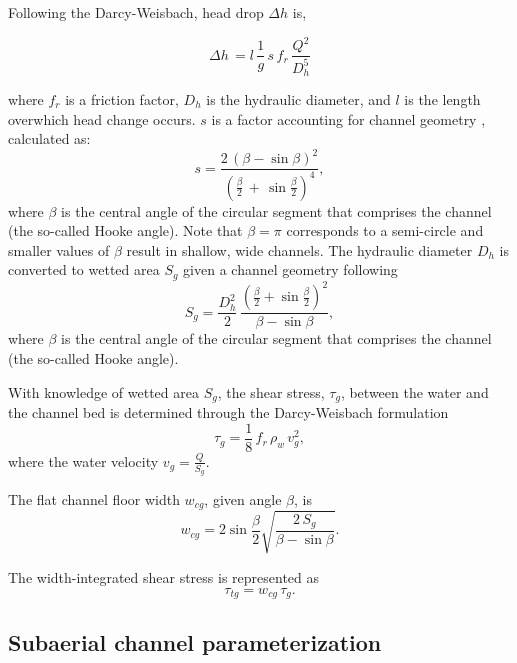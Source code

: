 \documentclass[11pt]{article}
\begin{document}
Following the Darcy-Weisbach, head drop $\Delta h$ is,
\begin{linenomath*}
  \begin{equation}
    \label{eq:dh}
    \Delta h \,  = l \,\frac{1}{g}\,s\,f_r\,\frac{Q^2}{D_h^5}
  \end{equation}
\end{linenomath*}
\noindent where $f_r$ is a friction factor, $D_h$ is the hydraulic diameter, and $l$ is the length overwhich head change occurs. $s$ is a factor accounting for channel geometry \citep{hooke1990}, calculated as:
\begin{equation}
  \label{eq:Hf}
  s = \frac{2\,(\beta -\sin \beta)^2}{(\frac{\beta}{2}\,+\,\sin \frac{\beta}{2})^4},
\end{equation}
where $\beta$ is the central angle of the circular segment that comprises the channel (the so-called Hooke angle). Note that $\beta =\pi$ corresponds to a semi-circle and
smaller values of $\beta$ result in shallow, wide channels.
The hydraulic diameter $D_h$ is converted to wetted area $S_g$ given a channel geometry following \citep{hooke1990}
\begin{equation}
  \label{eq:Dh2S}
  S_g= \frac{D_h^2}{2}\,\frac{(\frac{\beta}{2}+\sin \frac{\beta}{2})^2}{\beta - \sin \beta},
\end{equation}
where $\beta$ is the central angle of the circular segment that comprises the channel (the so-called Hooke angle). 


With knowledge of wetted area $S_g$, the shear stress, $\tau_g$, between the water and the channel bed is determined through the Darcy-Weisbach formulation
\begin{equation}
  \label{eq:tau}
  \tau_g=\frac{1}{8}\,f_r\,\rho_w\,v_g^2,
\end{equation}
%
where  the water velocity $v_g = \frac{Q}{S_g}$.

The flat channel floor width $w_{cg}$, given angle $\beta$, is
\begin{equation}
  \label{eq:dh2wc}
  w_{cg} = 2  \sin \frac{\beta}{2} \sqrt{\frac{2\, S_g}{\beta -\sin \beta}}.
\end{equation}

The width-integrated shear stress is represented as
\begin{equation}
  \label{eq:tautg}
  \tau_{tg}=w_{cg}\,\tau_g.
\end{equation}

\subsection{Subaerial channel  parameterization}
\label{sect:fluv}
\end{document}
